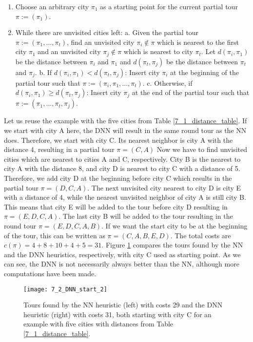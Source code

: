\begin{enumerate}
	\item Choose an arbitrary city $\pi_{1}$ as a starting point for the current partial tour $\pi:= (\pi_{1})$.
	\item  While there are unvisited cities left:
	\subitem a. Given the partial tour $\pi:= (\pi_{1}, ..., \pi_{t})$, find an unvisited city $\pi_{i} \notin \pi$ which is nearest to the first city $\pi_{1} $ and an unvisited city $\pi_{j} \notin \pi$ which is nearest to city $\pi_{t}$. Let $d(\pi_{i}, \pi_{1})$ be the distance between $\pi_{i} $ and $\pi_{1} $ and  $d(\pi_{t}, \pi_{j})$ be the distance between $\pi_{t}$ and $\pi_{j}$.
	\subitem b. If $d(\pi_{i}, \pi_{1}) < d(\pi_{t}, \pi_{j})$: Insert city $\pi_{i}$ at the beginning of the partial tour such that $\pi:= (\pi_{i}, \pi_{1}, ..., \pi_{t})$.
	\subitem c. Otherwise, if $d(\pi_{i}, \pi_{1}) \ge d(\pi_{t}, \pi_{j})$: Insert city $\pi_{j}$ at the end of 	the partial tour such that $\pi:= (\pi_{1}, ..., \pi_{t}, \pi_{j})$. 
\end{enumerate}

Let us reuse the example with the five cities from Table \ref{7_1_distance_table}. If we start with city A here, the DNN will result in the same round tour as the NN does. Therefore, we start with city C. Its nearest neighbor is city A with the distance 4, resulting in a partial tour $\pi = (C, A)$ Now we have to find unvisited cities which are nearest to cities A and C, respectively. City B is the nearest to city A with the distance 8, and city D is nearest to city C with a distance of 5. Therefore, we add city D at the beginning before city C which results in the partial tour $\pi =(D, C, A)$. The next unvisited city nearest to city D is city E with a distance of 4, while the nearest unvisited neighbor of city A is still city B. This means that city E will be added to the tour before city D resulting in $\pi =(E, D, C, A)$. The last city B will be added to the tour resulting in the round tour $\pi =(E, D, C, A, B)$. If we want the start city to be at the beginning of the tour, this can be written as $\pi =(C, A, B, E, D)$. The total costs are $c(\pi) = 4 + 8 + 10 + 4 + 5 = 31$. Figure \ref{7_2_DNN_start_2} compares the tours found by the NN and the DNN heuristics, respectively, with city C used as starting point. As we can see, the DNN is not necessarily always better than the NN, although more computations have been made.


\begin{figure}[htp] \centering
	\centering
	\texttt{[image: 7\_2\_DNN\_start\_2]}
	\caption{Tours found by the NN heuristic (left) with costs 29 and the DNN heuristic (right) with costs 31, both starting with city C for an example with five cities with distances from Table \ref{7_1_distance_table}.}
	\label{7_2_DNN_start_2}
\end{figure}



